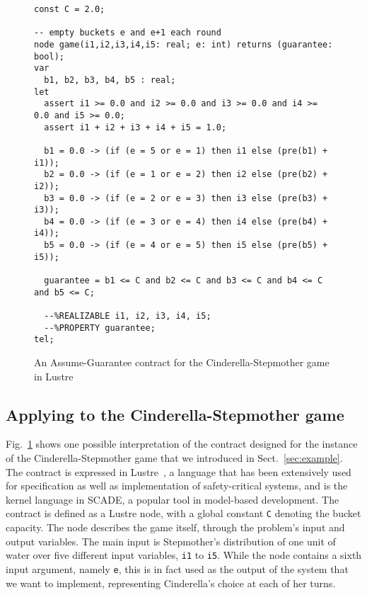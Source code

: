 \begin{figure}[!t]
\centering
 \begin{Verbatim}[fontsize=\scriptsize]
const C = 2.0;

-- empty buckets e and e+1 each round
node game(i1,i2,i3,i4,i5: real; e: int) returns (guarantee: bool);
var
  b1, b2, b3, b4, b5 : real;
let
  assert i1 >= 0.0 and i2 >= 0.0 and i3 >= 0.0 and i4 >= 0.0 and i5 >= 0.0;
  assert i1 + i2 + i3 + i4 + i5 = 1.0;

  b1 = 0.0 -> (if (e = 5 or e = 1) then i1 else (pre(b1) + i1));
  b2 = 0.0 -> (if (e = 1 or e = 2) then i2 else (pre(b2) + i2));
  b3 = 0.0 -> (if (e = 2 or e = 3) then i3 else (pre(b3) + i3));
  b4 = 0.0 -> (if (e = 3 or e = 4) then i4 else (pre(b4) + i4));
  b5 = 0.0 -> (if (e = 4 or e = 5) then i5 else (pre(b5) + i5));

  guarantee = b1 <= C and b2 <= C and b3 <= C and b4 <= C and b5 <= C;

  --%REALIZABLE i1, i2, i3, i4, i5;
  --%PROPERTY guarantee;
tel;
 \end{Verbatim}
\vspace{-1em}
\caption{An Assume-Guarantee contract for the Cinderella-Stepmother game in Lustre}
\label{fg:cind}
\end{figure}

\subsection{Applying \jsynvg to the Cinderella-Stepmother game}
\label{sec:algexample}

Fig.~\ref{fg:cind} shows one possible interpretation of the contract designed
for the instance of the Cinderella-Stepmother game that we introduced in Sect.~\ref{sec:example}. The contract
is expressed in Lustre~\cite{lustrev6}, a language
that has been extensively used for specification as well as implementation of
safety-critical systems, and is the kernel language in SCADE, a popular tool in
model-based development. The contract is defined as a Lustre node, with a global
constant \texttt{C} denoting the bucket capacity. The node describes the game itself,
through the problem's input and output variables. The main input is Stepmother's
distribution of one unit of water over five different input variables,
\texttt{i1} to \texttt{i5}. While the node contains a sixth input argument,
namely \texttt{e}, this is in fact used as the output of the system that we want to
implement, representing Cinderella's choice at each of her turns.

